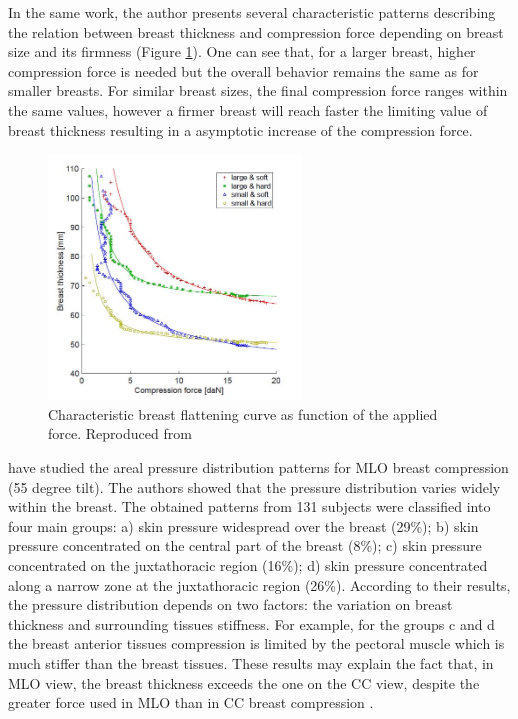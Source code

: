 In the same work, the author presents several characteristic patterns describing the relation between breast thickness and compression force depending on breast size and its firmness (Figure \ref{fig:thickness_force_patterns_groot}). One can see that, for a larger breast, higher compression force is needed but the overall behavior remains the same as for smaller breasts. For similar breast sizes, the final compression force ranges within the same values, however a firmer breast will reach faster the limiting value of breast thickness resulting in a asymptotic increase of the compression force.
\begin{figure}[!h]
\centering
\includegraphics[width=0.6\textwidth,keepaspectratio]{figures/thickness_force_patterns_groot.jpg} 
\caption{Characteristic breast flattening curve as function of the applied force. Reproduced from \cite{groot_towards_2015}}\label{fig:thickness_force_patterns_groot}
\end{figure}

\cite{dustler_breast_2012} have studied the areal pressure distribution patterns for MLO breast compression (55 degree tilt). The authors showed that the pressure distribution varies widely within the breast. The obtained patterns from 131 subjects were classified into four main groups: a) skin pressure widespread over the breast (29\%); b) skin pressure concentrated on the central part of the breast (8\%); c) skin pressure concentrated on the juxtathoracic region (16\%); d) skin pressure concentrated along a narrow zone at the juxtathoracic region (26\%). According to their results, the pressure distribution depends on two factors: the variation on breast thickness and surrounding tissues stiffness. For example, for the groups c and d the breast anterior tissues compression is limited by the pectoral muscle which is much stiffer than the breast tissues.  These results may explain the fact that, in MLO view, the breast thickness exceeds the one on the CC view, despite the greater force used in MLO than in CC breast compression \citep{mercer_practitioner_2013, helvie_breast_1994}. 

